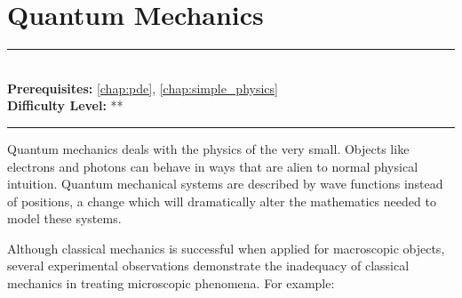 \documentclass[book.tex]{subfiles}
\begin{document}
\chapter{Quantum Mechanics}
\label{chap:quantum_mechanics}
\noindent\rule{11cm}{0.4pt} \\
\textbf{Prerequisites:} \autoref{chap:pde}, \autoref{chap:simple_physics} \\
\textbf{Difficulty Level:} ** \\
\noindent\rule{11cm}{0.4pt}
\vspace{5mm}

Quantum mechanics deals with the physics of the very small. Objects like electrons and photons can behave in ways that are alien to normal physical intuition. Quantum mechanical systems are described by wave functions instead of positions, a change which will dramatically alter the mathematics needed to model these systems.

Although classical mechanics is successful when applied for macroscopic objects, several experimental observations demonstrate the inadequacy of classical mechanics in treating microscopic phenomena. For example:
\end{document}
